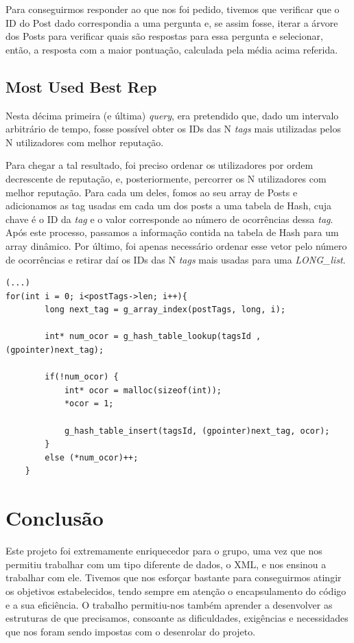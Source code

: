 \documentclass[a4paper, 11pt, oneside]{article}
\begin{document}
Para conseguirmos responder ao que nos foi pedido, tivemos que verificar que o ID do Post dado correspondia a uma pergunta e, se assim fosse, iterar a árvore dos Posts para verificar quais são respostas para essa pergunta e selecionar, então, a resposta com a maior pontuação, calculada pela média acima referida.

\subsection{Most Used Best Rep}
Nesta décima primeira (e última) \textit{query}, era pretendido que, dado um intervalo arbitrário de tempo, fosse possível obter os IDs das N \textit{tags} mais utilizadas pelos N utilizadores com melhor reputação.

Para chegar a tal resultado, foi preciso ordenar os utilizadores por ordem decrescente de reputação, e, posteriormente, percorrer os N utilizadores com melhor reputação. Para cada um deles, fomos ao seu array de Posts e adicionamos as tag usadas em cada um dos posts a uma tabela de Hash, cuja chave é o ID da \textit{tag} e o valor corresponde ao número de ocorrências dessa \textit{tag}. Após este processo, passamos a informação contida na tabela de Hash para um array dinâmico. Por último, foi apenas necessário ordenar esse vetor pelo número de ocorrências e retirar daí os IDs das N \textit{tags} mais usadas para uma \textit{LONG\_list}.

\begin{lstlisting}[caption=Query 11 - registo da ocorrência de uma \textit{tag} na tabela de Hash]
(...)
for(int i = 0; i<postTags->len; i++){
		long next_tag = g_array_index(postTags, long, i);

		int* num_ocor =	g_hash_table_lookup(tagsId , (gpointer)next_tag);

		if(!num_ocor) {
			int* ocor = malloc(sizeof(int));
			*ocor = 1;

			g_hash_table_insert(tagsId, (gpointer)next_tag, ocor);
		}
		else (*num_ocor)++; 
	}

\end{lstlisting}

\section{Conclusão}
Este projeto foi extremamente enriquecedor para o grupo, uma vez que nos permitiu trabalhar com um tipo diferente de dados, o XML, e nos ensinou a trabalhar com ele. Tivemos que nos esforçar bastante para conseguirmos atingir os objetivos estabelecidos, tendo sempre em atenção o encapsulamento do código e a sua eficiência. O trabalho permitiu-nos também aprender a desenvolver as estruturas de que precisamos, consoante as dificuldades, exigências e necessidades
que nos foram sendo impostas com o desenrolar do projeto.
\end{document}
